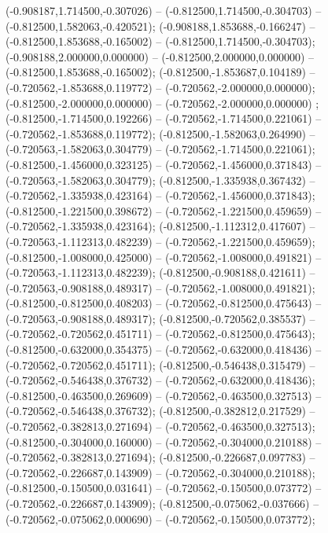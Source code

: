  (-0.908187,1.714500,-0.307026) -- (-0.812500,1.714500,-0.304703) -- (-0.812500,1.582063,-0.420521);
 (-0.908188,1.853688,-0.166247) -- (-0.812500,1.853688,-0.165002) -- (-0.812500,1.714500,-0.304703);
 (-0.908188,2.000000,0.000000) -- (-0.812500,2.000000,0.000000) -- (-0.812500,1.853688,-0.165002);
 (-0.812500,-1.853687,0.104189) -- (-0.720562,-1.853688,0.119772) -- (-0.720562,-2.000000,0.000000);
 (-0.812500,-2.000000,0.000000) -- (-0.720562,-2.000000,0.000000) ;
 (-0.812500,-1.714500,0.192266) -- (-0.720562,-1.714500,0.221061) -- (-0.720562,-1.853688,0.119772);
 (-0.812500,-1.582063,0.264990) -- (-0.720563,-1.582063,0.304779) -- (-0.720562,-1.714500,0.221061);
 (-0.812500,-1.456000,0.323125) -- (-0.720562,-1.456000,0.371843) -- (-0.720563,-1.582063,0.304779);
 (-0.812500,-1.335938,0.367432) -- (-0.720562,-1.335938,0.423164) -- (-0.720562,-1.456000,0.371843);
 (-0.812500,-1.221500,0.398672) -- (-0.720562,-1.221500,0.459659) -- (-0.720562,-1.335938,0.423164);
 (-0.812500,-1.112312,0.417607) -- (-0.720563,-1.112313,0.482239) -- (-0.720562,-1.221500,0.459659);
 (-0.812500,-1.008000,0.425000) -- (-0.720562,-1.008000,0.491821) -- (-0.720563,-1.112313,0.482239);
 (-0.812500,-0.908188,0.421611) -- (-0.720563,-0.908188,0.489317) -- (-0.720562,-1.008000,0.491821);
 (-0.812500,-0.812500,0.408203) -- (-0.720562,-0.812500,0.475643) -- (-0.720563,-0.908188,0.489317);
 (-0.812500,-0.720562,0.385537) -- (-0.720562,-0.720562,0.451711) -- (-0.720562,-0.812500,0.475643);
 (-0.812500,-0.632000,0.354375) -- (-0.720562,-0.632000,0.418436) -- (-0.720562,-0.720562,0.451711);
 (-0.812500,-0.546438,0.315479) -- (-0.720562,-0.546438,0.376732) -- (-0.720562,-0.632000,0.418436);
 (-0.812500,-0.463500,0.269609) -- (-0.720562,-0.463500,0.327513) -- (-0.720562,-0.546438,0.376732);
 (-0.812500,-0.382812,0.217529) -- (-0.720562,-0.382813,0.271694) -- (-0.720562,-0.463500,0.327513);
 (-0.812500,-0.304000,0.160000) -- (-0.720562,-0.304000,0.210188) -- (-0.720562,-0.382813,0.271694);
 (-0.812500,-0.226687,0.097783) -- (-0.720562,-0.226687,0.143909) -- (-0.720562,-0.304000,0.210188);
 (-0.812500,-0.150500,0.031641) -- (-0.720562,-0.150500,0.073772) -- (-0.720562,-0.226687,0.143909);
 (-0.812500,-0.075062,-0.037666) -- (-0.720562,-0.075062,0.000690) -- (-0.720562,-0.150500,0.073772);
